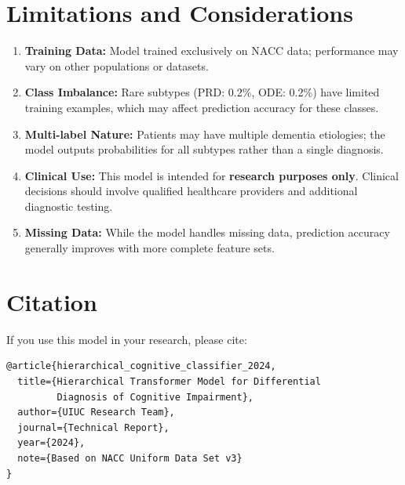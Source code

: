 \documentclass[11pt,a4paper]{article}
\begin{document}
\section{Limitations and Considerations}

\begin{enumerate}
    \item \textbf{Training Data:} Model trained exclusively on NACC data; performance may vary on other populations or datasets.

    \item \textbf{Class Imbalance:} Rare subtypes (PRD: 0.2\%, ODE: 0.2\%) have limited training examples, which may affect prediction accuracy for these classes.

    \item \textbf{Multi-label Nature:} Patients may have multiple dementia etiologies; the model outputs probabilities for all subtypes rather than a single diagnosis.

    \item \textbf{Clinical Use:} This model is intended for \textbf{research purposes only}. Clinical decisions should involve qualified healthcare providers and additional diagnostic testing.

    \item \textbf{Missing Data:} While the model handles missing data, prediction accuracy generally improves with more complete feature sets.
\end{enumerate}

\section{Citation}

If you use this model in your research, please cite:

\begin{verbatim}
@article{hierarchical_cognitive_classifier_2024,
  title={Hierarchical Transformer Model for Differential
         Diagnosis of Cognitive Impairment},
  author={UIUC Research Team},
  journal={Technical Report},
  year={2024},
  note={Based on NACC Uniform Data Set v3}
}
\end{verbatim}
\end{document}
